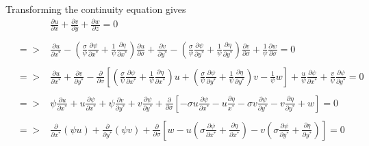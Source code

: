 \documentclass[oribibl]{llncs}
\begin{document}
Transforming the continuity equation gives
\begin{eqnarray}\label{eq:coneq2}
&& \frac{\partial u}{\partial x} + \frac{\partial v}{\partial y} + \frac{\partial w}{\partial z} = 0  \nonumber \\ \nonumber \\ 
&=>&  \frac{\partial u}{\partial x^*} - \left(  \frac{\sigma}{\psi} \frac{\partial \psi}{\partial x^*} + \frac{1}{\psi}\frac{\partial \eta}{\partial x^*}\right) \frac{\partial u}{\partial \sigma}  + \frac{\partial v}{\partial y^*} - \left(  \frac{\sigma}{\psi} \frac{\partial \psi}{\partial y^*} + \frac{1}{\psi}\frac{\partial \eta}{\partial y^*}\right) \frac{\partial v}{\partial \sigma}  +  \frac{1}{\psi}\frac{\partial w}{\partial \sigma} = 0  \nonumber \\ \nonumber \\ 
&=>&  \frac{\partial u}{\partial x^*} +  \frac{\partial v}{\partial y^*}  - \frac{\partial}{\partial \sigma} \left[   \left(  \frac{\sigma}{\psi} \frac{\partial \psi}{\partial x^*} + \frac{1}{\psi}\frac{\partial \eta}{\partial x^*}\right) u + \left(  \frac{\sigma}{\psi} \frac{\partial \psi}{\partial y^*} + \frac{1}{\psi}\frac{\partial \eta}{\partial y^*}\right)  v - \frac{1}{\psi}w \right] +\frac{u}{\psi}\frac{\partial \psi}{\partial x^*} +\frac{v}{\psi}\frac{\partial \psi}{\partial y^*} = 0   \nonumber \\ \nonumber \\
&=>& \psi\frac{\partial u}{\partial x^*} +  u\frac{\partial \psi}{\partial x^*} + \psi\frac{\partial v}{\partial y^*} +  v\frac{\partial \psi}{\partial y^*} + \frac{\partial}{\partial \sigma} \left[  -\sigma u \frac{\partial \psi}{\partial x^*} - u \frac{\partial \eta}{x^*} - \sigma v \frac{\partial \psi}{\partial y^*} -v\frac{\partial \eta}{\partial y^*} +w \right] = 0  \nonumber \\ \nonumber \\ 
&=>&  \frac{\partial}{\partial x^*}(\psi u) +\frac{\partial}{\partial y^*}(\psi v) + \frac{\partial}{\partial \sigma} \left[  w - u \left( \sigma \frac{\partial \psi}{\partial x^*} + \frac{\partial \eta}{\partial x^*}\right)  -v \left( \sigma \frac{\partial \psi}{\partial y^*} + \frac{\partial \eta}{\partial y^*}\right) \right] = 0
\end{eqnarray}
\end{document}
